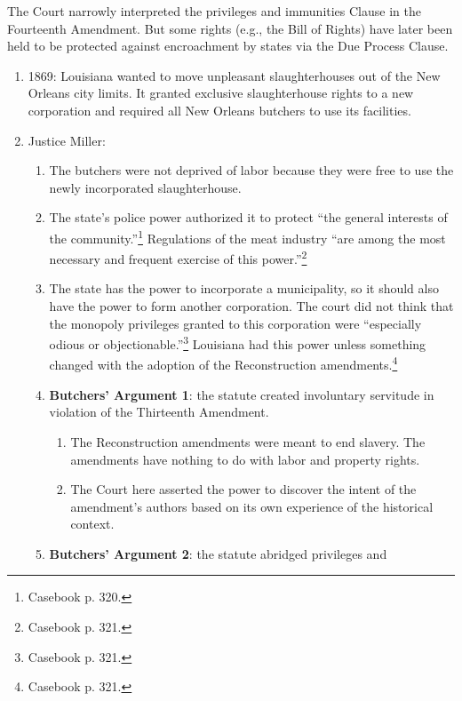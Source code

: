 The Court narrowly interpreted the privileges and immunities Clause in the 
Fourteenth Amendment. But some rights (e.g., the Bill of Rights) have later 
been held to be protected against encroachment by states via the Due Process 
Clause.

\begin{enumerate}
    \item 1869: Louisiana wanted to move unpleasant slaughterhouses out of the 
    New Orleans city limits. It granted exclusive slaughterhouse rights to a 
    new corporation and required all New Orleans butchers to use its 
    facilities. 
    \item Justice Miller:
    \begin{enumerate}
        \item The butchers were not deprived of labor because they were free 
        to use the newly incorporated slaughterhouse.
        \item The state's police power authorized it to protect ``the general 
        interests of the community.''\footnote{Casebook p. 320.} Regulations of 
        the meat industry ``are among the most necessary and frequent exercise 
        of this power.''\footnote{Casebook p. 321.}
        \item The state has the power to incorporate a municipality, so it 
        should also have the power to form another corporation. The court did 
        not think that the monopoly privileges granted to this corporation 
        were ``especially odious or objectionable.''\footnote{Casebook p. 
        321.} Louisiana had this power unless something changed with the 
        adoption of the Reconstruction amendments.\footnote{Casebook p. 321.}
        \item \textbf{Butchers' Argument 1}: the statute created involuntary 
        servitude in violation of the Thirteenth Amendment.
        \begin{enumerate}
            \item The Reconstruction amendments were meant to end slavery. 
            The amendments have nothing to do with labor and property rights.
            \item The Court here asserted the power to discover the intent of 
            the amendment's authors based on its own experience of the 
            historical context.
        \end{enumerate}
        \item \textbf{Butchers' Argument 2}: the statute abridged privileges and 

\end{enumerate}
\end{enumerate}
